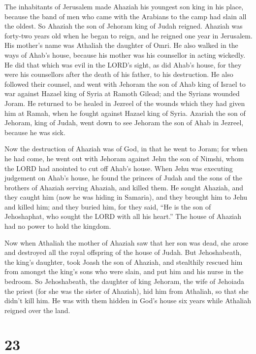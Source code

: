  The inhabitants of Jerusalem made Ahaziah his youngest son
king in his place, because the band of men who came with the Arabians to
the camp had slain all the oldest. So Ahaziah the son of Jehoram king of
Judah reigned.  Ahaziah was forty-two years old when he
began to reign, and he reigned one year in Jerusalem. His mother's name
was Athaliah the daughter of Omri.  He also walked in the
ways of Ahab's house, because his mother was his counsellor in acting
wickedly.  He did that which was evil in the LORD's sight,
as did Ahab's house, for they were his counsellors after the death of
his father, to his destruction.  He also followed their
counsel, and went with Jehoram the son of Ahab king of Israel to war
against Hazael king of Syria at Ramoth Gilead; and the Syrians wounded
Joram.  He returned to be healed in Jezreel of the wounds
which they had given him at Ramah, when he fought against Hazael king of
Syria. Azariah the son of Jehoram, king of Judah, went down to see
Jehoram the son of Ahab in Jezreel, because he was sick.

 Now the destruction of Ahaziah was of God, in that he went
to Joram; for when he had come, he went out with Jehoram against Jehu
the son of Nimshi, whom the LORD had anointed to cut off Ahab's house.
 When Jehu was executing judgement on Ahab's house, he found
the princes of Judah and the sons of the brothers of Ahaziah serving
Ahaziah, and killed them.  He sought Ahaziah, and they
caught him (now he was hiding in Samaria), and they brought him to Jehu
and killed him; and they buried him, for they said, ``He is the son of
Jehoshaphat, who sought the LORD with all his heart.'' The house of
Ahaziah had no power to hold the kingdom.

 Now when Athaliah the mother of Ahaziah saw that her son
was dead, she arose and destroyed all the royal offspring of the house
of Judah.  But Jehoshabeath, the king's daughter, took
Joash the son of Ahaziah, and stealthily rescued him from amongst the
king's sons who were slain, and put him and his nurse in the bedroom. So
Jehoshabeath, the daughter of king Jehoram, the wife of Jehoiada the
priest (for she was the sister of Ahaziah), hid him from Athaliah, so
that she didn't kill him.  He was with them hidden in God's
house six years while Athaliah reigned over the land.

\hypertarget{section-22}{%
\section{23}\label{section-22}}

